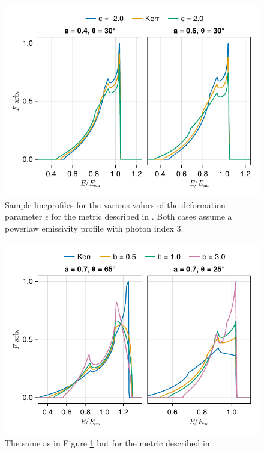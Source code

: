 \documentclass[fleqn,usenatbib]{mnras}
\begin{document}
\begin{figure}
    \centering
    \includegraphics[width=0.99\columnwidth]{figures/lineprofiles.johannsen-comparison.pdf}
    \caption{Sample lineprofiles for the various values of the deformation
    parameter $\epsilon$ for the metric described in
    \citet{johannsen_testing_2013}. Both cases assume a powerlaw emissivity profile
    with photon index $3$.}
    \label{fig:reflection-johannsen}
\end{figure}

\begin{figure}
    \centering
    \includegraphics[width=0.99\columnwidth]{figures/lineprofile.emda.pdf}
    \caption{The same as in Figure \ref{fig:reflection-johannsen} but for the
    metric described in \citet{garcia_class_1995}.}
    \label{fig:reflection-emda}
\end{figure}
\end{document}
